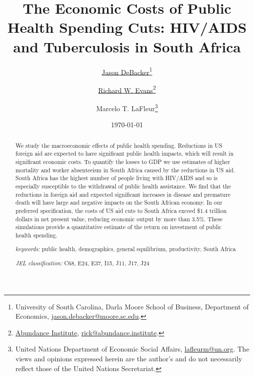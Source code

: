 \documentclass[letterpaper,12pt]{article}
\theoremstyle{definition}
\begin{document}
\begin{titlepage}
\title{The Economic Costs of Public Health Spending Cuts: HIV/AIDS and Tuberculosis in South Africa}
\date{\today}
\author{\href{http://jasondebacker.com/}{Jason DeBacker}\thanks{University of South Carolina, Darla Moore School of Business, Department of Economics, \href{mailto:jason.debacker@moore.sc.edu}{jason.debacker@moore.sc.edu}.}\and \href{https://sites.google.com/site/rickecon}{Richard W. Evans}\thanks{\href{https://abundance.institute/}{Abundance Institute}, \href{mailto:rick@abundance.institute}{rick@abundance.institute}.}\and {Marcelo T. LaFleur}\thanks{{United Nations Department of Economic Social Affairs}, \href{mailto:lafleurm@un.org}{lafleurm@un.org}. The views and opinions expressed herein are the author's and do not necessarily reflect those of the United Nations Secretariat.}}
\maketitle
\vspace{-2mm}
\begin{abstract}
\small{We study the macroeconomic effects of public health spending. Reductions in US foreign aid are expected to have significant public health impacts, which will result in significant economic costs. To quantify the losses to GDP we use estimates of higher mortality and worker absenteeism in South Africa caused by the reductions in US aid. South Africa has the highest number of people living with HIV/AIDS and so is especially susceptible to the withdrawal of public health assistance. We find that the reductions in foreign aid and expected significant increases in disease and premature death will have large and negative impacts on the South African economy. In our preferred specification, the costs of US aid cuts to South Africa exceed \$1.4 trillion dollars in net present value, reducing economic output by more than 3.5\%. These simulations provide a quantitative estimate of the return on investment of public health spending.}

\vspace{10mm}

\noindent\textit{keywords:}\: public health, demographics, general equilibrium, productivity, South Africa

\vspace{10mm}

\noindent\textit{JEL classification:} C68, E24, E37, I15, J11, J17, J24


\end{abstract}
\thispagestyle{empty}
\end{titlepage}
\end{document}
